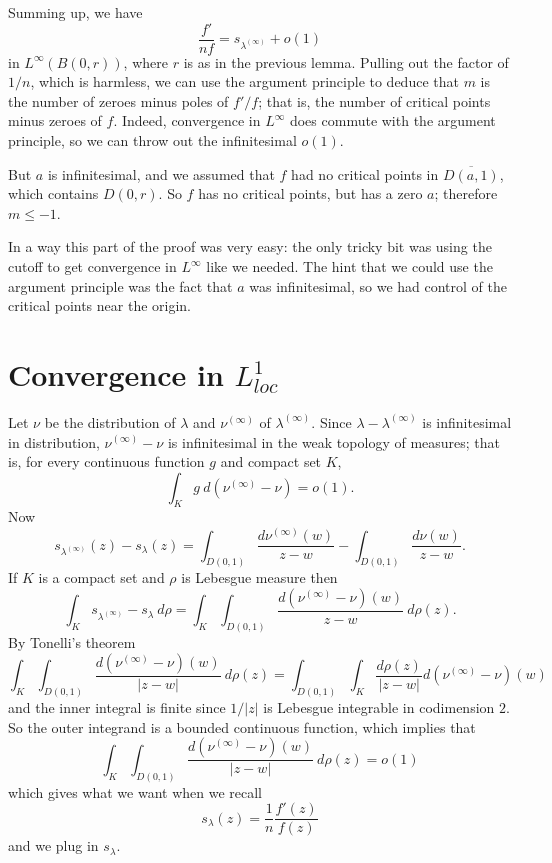 \documentclass[12pt]{article}
\begin{document}
Summing up, we have
$$\frac{f'}{nf} = s_{\lambda^{(\infty)}} + o(1)$$
in $L^\infty(B(0, r))$, where $r$ is as in the previous lemma.
Pulling out the factor of $1/n$, which is harmless, we can use the argument principle to deduce that $m$ is the number of zeroes minus poles of $f'/f$; that is, the number of critical points minus zeroes of $f$.
Indeed, convergence in $L^\infty$ does commute with the argument principle, so we can throw out the infinitesimal $o(1)$.

But $a$ is infinitesimal, and we assumed that $f$ had no critical points in $\overline{D(a, 1)}$, which contains $D(0, r)$.
So $f$ has no critical points, but has a zero $a$; therefore $m \leq -1$.

In a way this part of the proof was very easy: the only tricky bit was using the cutoff to get convergence in $L^\infty$ like we needed.
The hint that we could use the argument principle was the fact that $a$ was infinitesimal, so we had control of the critical points near the origin.

\section{Convergence in $L^1_{loc}$}
Let $\nu$ be the distribution of $\lambda$ and $\nu^{(\infty)}$ of $\lambda^{(\infty)}$.
Since $\lambda - \lambda^{(\infty)}$ is infinitesimal in distribution, $\nu^{(\infty)} - \nu$ is infinitesimal in the weak topology of measures; that is, for every continuous function $g$ and compact set $K$,
$$\int_K g ~d(\nu^{(\infty)} - \nu) = o(1).$$
Now
$$s_{\lambda^{(\infty)}}(z) - s_\lambda(z) = \int_{D(0, 1)} \frac{d\nu^{(\infty)}(w)}{z - w} - \int_{D(0, 1)} \frac{d\nu(w)}{z - w}.$$
If $K$ is a compact set and $\rho$ is Lebesgue measure then
$$\int_K s_{\lambda^{(\infty)}} - s_\lambda ~d\rho = \int_K \int_{D(0, 1)} \frac{d(\nu^{(\infty)} - \nu)(w)}{z - w} ~d\rho(z).$$
By Tonelli's theorem
$$\int_K \int_{D(0, 1)} \frac{d(\nu^{(\infty)} - \nu)(w)}{|z - w|} ~d\rho(z) = \int_{D(0, 1)} \int_K \frac{d\rho(z)}{|z - w|} d(\nu^{(\infty)} - \nu)(w)$$
and the inner integral is finite since $1/|z|$ is Lebesgue integrable in codimension $2$.
So the outer integrand is a bounded continuous function, which implies that
$$\int_K \int_{D(0, 1)} \frac{d(\nu^{(\infty)} - \nu)(w)}{|z - w|} ~d\rho(z) = o(1)$$
which gives what we want when we recall
$$s_\lambda(z) = \frac{1}{n} \frac{f'(z)}{f(z)}$$
and we plug in $s_\lambda$.
\end{document}
